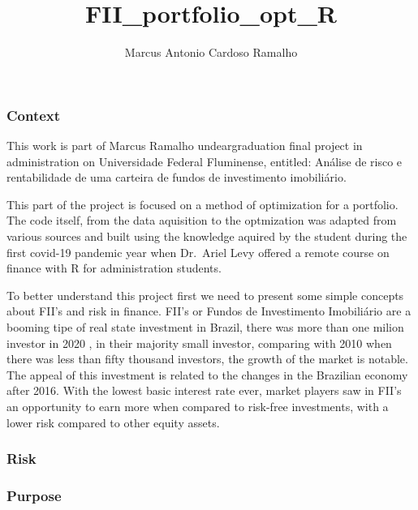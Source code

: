 \documentclass[
  letterpaper,
  DIV=11,
  numbers=noendperiod]{scrartcl}
\title{FII\_portfolio\_opt\_R}
\author{Marcus Antonio Cardoso Ramalho}
\date{}
\begin{document}
\maketitle
\ifdefined\Shaded\renewenvironment{Shaded}{\begin{tcolorbox}[interior hidden, borderline west={3pt}{0pt}{shadecolor}, sharp corners, boxrule=0pt, breakable, frame hidden, enhanced]}{\end{tcolorbox}}\fi

\hypertarget{context}{%
\subsubsection{Context}\label{context}}

This work is part of Marcus Ramalho undeargraduation final project in
administration on Universidade Federal Fluminense, entitled: Análise de
risco e rentabilidade de uma carteira de fundos de investimento
imobiliário.

This part of the project is focused on a method of optimization for a
portfolio. The code itself, from the data aquisition to the optmization
was adapted from various sources and built using the knowledge aquired
by the student during the first covid-19 pandemic year when Dr.~Ariel
Levy offered a remote course on finance with R for administration
students.

To better understand this project first we need to present some simple
concepts about FII's and risk in finance. FII's or Fundos de
Investimento Imobiliário are a booming tipe of real state investment in
Brazil, there was more than one milion investor in 2020 , in their
majority small investor, comparing with 2010 when there was less than
fifty thousand investors, the growth of the market is notable. The
appeal of this investment is related to the changes in the Brazilian
economy after 2016. With the lowest basic interest rate ever, market
players saw in FII's an opportunity to earn more when compared to
risk-free investments, with a lower risk compared to other equity
assets.

\hypertarget{risk}{%
\subsubsection{Risk}\label{risk}}

\hypertarget{purpose}{%
\subsubsection{Purpose}\label{purpose}}
\end{document}
